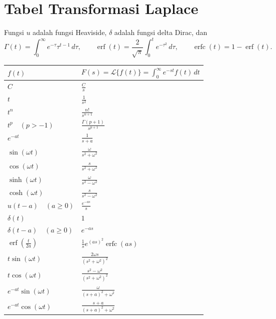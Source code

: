 \chapter{Tabel Transformasi Laplace} \label{laplacelist:appendix}


Fungsi $u$ adalah fungsi
Heaviside, $\delta$ adalah fungsi delta Dirac, dan 
\begin{equation*}
\Gamma(t) =
\int_0^\infty e^{-\tau} \tau^{t-1} \, d\tau ,
\qquad
\operatorname{erf}(t) =
\frac{2}{\sqrt{\pi}} \int_0^t e^{-\tau^2} \, d\tau ,
\qquad
\operatorname{erfc}(t) =
1 - \operatorname{erf}(t) .
\end{equation*}

\begin{center}
\begin{tabular}{@{}ll@{}}
\toprule
$f(t)$ &
$F(s) = \mathcal{L} \bigl\{ f(t) \bigr\}= \int_0^\infty e^{-st} f(t) \, dt$ \\
\midrule
$C$ & $\frac{C}{s}$
\\[6pt]
$t$ & $\frac{1}{s^2}$
\\[6pt]
$t^n$ & $\frac{n!}{s^{n+1}}$
\\[6pt]
$t^p \quad (p > -1)$ & $\frac{\Gamma(p+1)}{s^{p+1}}$
\\[6pt]
$e^{-at}$ & $\frac{1}{s+a}$
\\[6pt]
$\sin (\omega t)$ & $\frac{\omega}{s^2+\omega^2}$
\\[6pt]
$\cos (\omega t)$ & $\frac{s}{s^2+\omega^2}$
\\[6pt]
$\sinh (\omega t)$ & $\frac{\omega}{s^2-\omega^2}$
\\[6pt]
$\cosh (\omega t)$ & $\frac{s}{s^2-\omega^2}$
\\[6pt]
$u(t-a) \quad (a \geq 0)$ & $\frac{e^{-as}}{s}$
\\[6pt]
$\delta(t)$ & $1$
\\[6pt]
$\delta(t-a) \quad (a \geq 0)$ & $e^{-as}$
\\[6pt]
$\operatorname{erf}\left( \frac{t}{2a} \right)$ & $\frac{1}{s} e^{(as)^2} \operatorname{erfc}(as)$
\\[6pt]
$t \sin(\omega t)$ &
$\frac{2\omega s}{{(s^2+\omega^2)}^2}$
\\[6pt]
$t \cos(\omega t)$ &
$\frac{s^2-\omega^2}{{(s^2+\omega^2)}^2}$
\\[6pt]
$e^{-at} \sin(\omega t)$ &
$\frac{\omega}{{(s+a)}^2 + \omega^2}$
\\[6pt]
$e^{-at} \cos(\omega t)$ &
$\frac{s+a}{{(s+a)}^2 + \omega^2}$
\\[6pt]
\bottomrule
\end{tabular}
\end{center}

